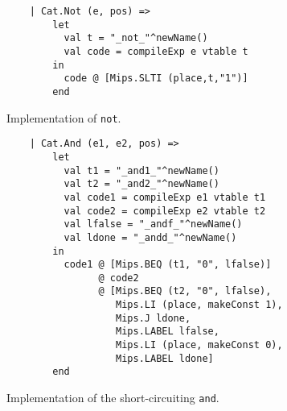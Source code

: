 \begin{figure}
    \centering
    \begin{lstlisting}
    | Cat.Not (e, pos) =>
        let
          val t = "_not_"^newName()
          val code = compileExp e vtable t
        in
          code @ [Mips.SLTI (place,t,"1")]
        end
    \end{lstlisting}
    \caption{Implementation of \texttt{not}.}
    \label{fig:compiler:not}
\end{figure}
\begin{figure}
    \centering
    \begin{lstlisting}
    | Cat.And (e1, e2, pos) =>
        let
          val t1 = "_and1_"^newName()
          val t2 = "_and2_"^newName()
          val code1 = compileExp e1 vtable t1
          val code2 = compileExp e2 vtable t2
          val lfalse = "_andf_"^newName()
          val ldone = "_andd_"^newName()
        in
          code1 @ [Mips.BEQ (t1, "0", lfalse)]
                @ code2
                @ [Mips.BEQ (t2, "0", lfalse),
                   Mips.LI (place, makeConst 1),
                   Mips.J ldone,
                   Mips.LABEL lfalse,
                   Mips.LI (place, makeConst 0),
                   Mips.LABEL ldone]
        end
    \end{lstlisting}
    \caption{Implementation of the short-circuiting \texttt{and}.}
    \label{fig:compiler:and}
\end{figure}

